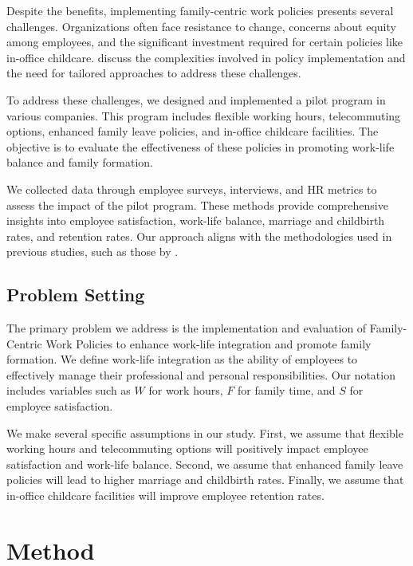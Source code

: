 \documentclass{article} %
\begin{document}
Despite the benefits, implementing family-centric work policies presents several challenges. Organizations often face resistance to change, concerns about equity among employees, and the significant investment required for certain policies like in-office childcare. \citet{wang2023describe} discuss the complexities involved in policy implementation and the need for tailored approaches to address these challenges.

To address these challenges, we designed and implemented a pilot program in various companies. This program includes flexible working hours, telecommuting options, enhanced family leave policies, and in-office childcare facilities. The objective is to evaluate the effectiveness of these policies in promoting work-life balance and family formation.

We collected data through employee surveys, interviews, and HR metrics to assess the impact of the pilot program. These methods provide comprehensive insights into employee satisfaction, work-life balance, marriage and childbirth rates, and retention rates. Our approach aligns with the methodologies used in previous studies, such as those by \citet{liu2023agentbench}.

\subsection{Problem Setting}
\label{sec:problem_setting}

The primary problem we address is the implementation and evaluation of Family-Centric Work Policies to enhance work-life integration and promote family formation. We define work-life integration as the ability of employees to effectively manage their professional and personal responsibilities. Our notation includes variables such as $W$ for work hours, $F$ for family time, and $S$ for employee satisfaction.

We make several specific assumptions in our study. First, we assume that flexible working hours and telecommuting options will positively impact employee satisfaction and work-life balance. Second, we assume that enhanced family leave policies will lead to higher marriage and childbirth rates. Finally, we assume that in-office childcare facilities will improve employee retention rates.

\section{Method}
\label{sec:method}
\end{document}
